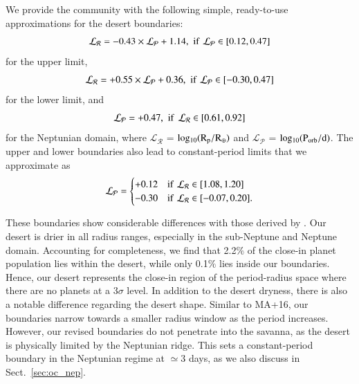 \documentclass[]{aa}
\begin{document}
We provide the community with the following simple, ready-to-use approximations for the desert boundaries:
\begin{equation}
    \label{eq_6}
    \mathcal{L_{R}} = -0.43 \times \mathcal{L_{P}} + 1.14, \,\, \rm{if} \,\, \mathcal{L_{P}} \in [0.12, 0.47] 
\end{equation}
for the upper limit,
\begin{equation}
    \mathcal{L_{R}} = +0.55 \times \mathcal{L_{P}} + 0.36, \,\, \rm{if} \,\, \mathcal{L_{P}} \in [-0.30, 0.47]
\end{equation}
for the lower limit, and
\begin{equation}
    \mathcal{L_{P}} =+0.47, \,\, \rm{if} \,\ \mathcal{L_{R}} \in [0.61, 0.92] 
\end{equation}
\noindent for the Neptunian domain, where $\mathcal{L_{R}}$ = $\rm log_{10}(R_{\rm p}/R_{\oplus})$ and $\mathcal{L_{P}}$ = $\rm log_{10}(P_{\rm orb}/d)$. The upper and lower boundaries also lead to constant-period limits that we approximate as
\begin{equation}
\label{eq_9}
\mathcal{L_{P}} =\begin{cases} 
 +0.12 & \rm{if} \,\, \mathcal{L_{R}} \in [1.08, 1.20] \\  
 -0.30 & \rm{if} \,\, \mathcal{L_{R}} \in [-0.07, 0.20].  
 \end{cases}
\end{equation}

These boundaries show considerable differences with those derived by \citet{2016A&A...589A..75M}. Our desert is drier in all radius ranges, especially in the sub-Neptune and Neptune domain. Accounting for completeness, we find that 2.2$\%$ of the close-in planet population lies within the \citet{2016A&A...589A..75M} desert, while only 0.1$\%$ lies inside our boundaries. Hence, our desert represents the close-in region of the period-radius space where there are no planets at a 3$\sigma$ level. In addition to the desert dryness, there is also a notable difference regarding the desert shape. Similar to MA+16, our boundaries narrow towards a smaller radius window as the period increases. However, our revised boundaries do not penetrate into the savanna, as the desert is physically limited by the Neptunian ridge. This sets a constant-period boundary in the Neptunian regime at $\simeq$3 days, as we also discuss in Sect.~\ref{sec:oc_nep}.

\end{document}
